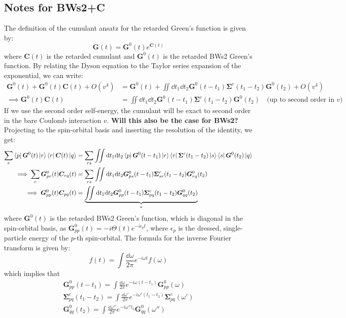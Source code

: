 \subsection{Notes for BWs2+C}
The definition of the cumulant ansatz for the retarded Green's function is given by:
\begin{equation}
    \bm{G}(t) = \bm{G}^0(t)e^{\bm{C}(t)}
\end{equation}
where $\bm{C}(t)$ is the retarded cumulant and $\bm{G}^0(t)$ is the retarded BWs2 Green's function. By relating the Dyson equation to the Taylor series expansion of the exponential, we can write:
\begin{align}
\bm{G}^0(t) + \bm{G}^0(t) \bm{C}(t) + O(v^4) &= \bm{G}^0(t) + \iint \dd t_1 \dd t_2 \bm{G}^0(t-t_1) \bm{\Sigma}^c(t_1 - t_2) \bm{G}^0(t_2) + O(v^4) \\
    \implies \bm{G}^0(t) \bm{C}(t) &= \iint \dd t_1 \dd t_2 \bm{G}^0(t-t_1) \bm{\Sigma}^c(t_1 - t_2) \bm{G}^0(t_2) \quad \text{(up to second order in $v$)}
\end{align}
{If we use the second order self-energy, the cumulant will be exact to second order in the bare Coulomb interaction $v$.} \textbf{Will this also be the case for BWs2?}
Projecting to the spin-orbital basis and inserting the resolution of the identity, we get:
\begin{align}
    \sum_{r}\bra{p}\bm{G}^0(t) \ket{r}\bra{r}\bm{C}(t)\ket{q} &= \sum_{rs}\iint \dd t_1 \dd t_2 \bra{p}\bm{G}^0(t-t_1)\ket{r} \bra{r}\bm{\Sigma}^c(t_1 - t_2)\ket{s} \bra{s}\bm{G}^0(t_2)\ket{q} \\
    \implies \sum_{r}\bm{G}_{pr}^0(t) \bm{C}_{rq}(t) &= \sum_{rs}\iint \dd t_1 \dd t_2 \bm{G}_{ps}^0(t-t_1) \bm{\Sigma}_{sr}^c(t_1 - t_2) \bm{G}_{rq}^0(t_2)\\
    \implies \bm{G}_{pp}^{0}(t) \bm{C}_{pq}(t) &= \underbrace{\iint \dd t_1 \dd t_2 \bm{G}_{pp}^{0}(t-t_1) \bm{\Sigma}_{pq}^c(t_1 - t_2) \bm{G}_{qq}^{0}(t_2)}_{*}
    \label{eqn:cumulant_connection}
\end{align}
where $\bm{G}^0(t)$ is the retarded BWs2 Green's function, which is diagonal in the spin-orbital basis, as $\bm{G}_{pp}^{0}(t) = -i\Theta(t)e^{-i\epsilon_p t}$, where $\epsilon_p$ is the dressed, single-particle energy of the $p$-th spin-orbital.
The formula for the inverse Fourier transform is given by:
\begin{equation}
    f(t) = \int \frac{\dd \omega}{2\pi} e^{-i\omega t} f(\omega)
\end{equation}
which implies that
\begin{align}
    \bm{G}_{pp}^{0}(t-t_1) = \int \frac{\dd \omega}{2\pi} e^{-i\omega (t-t_1)} \bm{G}_{pp}^{0}(\omega)\\
    \bm{\Sigma}_{pq}^c(t_1 - t_2) = \int \frac{\dd \omega'}{2\pi} e^{-i\omega' (t_1 - t_2)} \bm{\Sigma}_{pq}^c(\omega')\\
    \bm{G}_{qq}^{0}(t_2) = \int \frac{\dd \omega''}{2\pi} e^{-i\omega'' t_2} \bm{G}_{qq}^{0}(\omega'')
\end{align}
